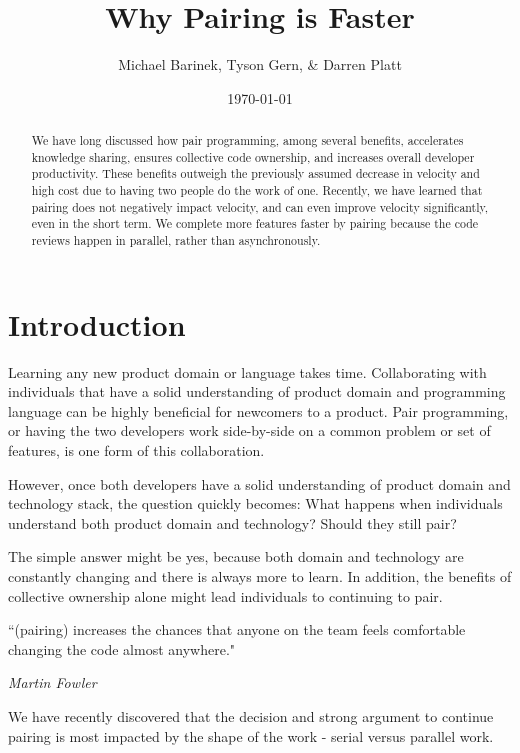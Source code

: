 \documentclass[letterpaper]{article}
\title{Why Pairing is Faster}
\author{Michael Barinek, Tyson Gern, \& Darren Platt}
\date{\today}
\theoremstyle{definition}
\begin{document}
    \maketitle

    \begin{abstract}
        We have long discussed how pair programming, among several benefits, accelerates knowledge sharing, ensures
        collective code ownership, and increases overall developer productivity.
        These benefits outweigh the previously assumed decrease in velocity and high cost due to having two people do
        the work of one.
        Recently, we have learned that pairing does not negatively impact velocity, and can even improve velocity
        significantly, even in the short term.
        We complete more features faster by pairing because the code reviews happen in parallel, rather than asynchronously.
    \end{abstract}


    \section{Introduction}\label{sec:introduction}

    Learning any new product domain or language takes time.
    Collaborating with individuals that have a solid understanding of product domain and programming language can be
    highly beneficial for newcomers to a product.
    Pair programming, or having the two developers work side-by-side on a common problem or set of features, is one form
    of this collaboration.

    However, once both developers have a solid understanding of product domain and technology stack, the question
    quickly becomes: What happens when individuals understand both product domain and technology?
    Should they still pair?

    The simple answer might be yes, because both domain and technology are constantly changing and there is always more
    to learn.
    In addition, the benefits of collective ownership alone might lead individuals to continuing to pair.

    \begin{displayquote}
        ``(pairing) increases the chances that anyone on the team feels comfortable changing the code almost anywhere."

        \textit{Martin Fowler}
    \end{displayquote}

    We have recently discovered that the decision and strong argument to continue pairing is most impacted by the shape
    of the work - serial versus parallel work.
\end{document}
